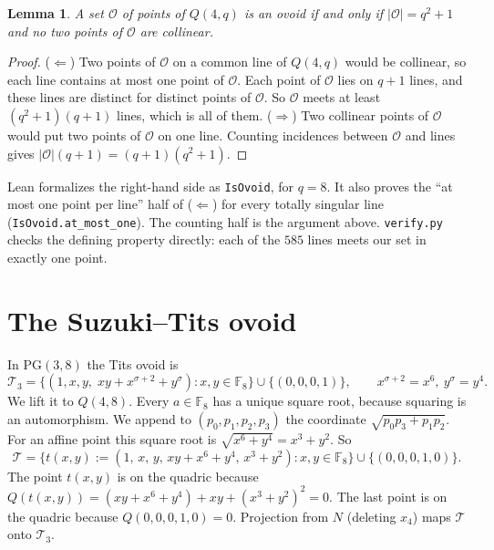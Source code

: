 \documentclass[11pt]{article}
\newtheorem{lemma}[theorem]{Lemma}
\theoremstyle{definition}
\theoremstyle{remark}
\newcommand{\F}{\mathbb{F}_8}
\begin{document}
\begin{lemma}\label{lem:equiv}
A set $\mathcal{O}$ of points of $Q(4,q)$ is an ovoid if and only if
$|\mathcal{O}|=q^2+1$ and no two points of $\mathcal{O}$ are collinear.
\end{lemma}
\begin{proof}
($\Leftarrow$) Two points of $\mathcal{O}$ on a common line of $Q(4,q)$ would
be collinear, so each line contains at most one point of $\mathcal{O}$. Each
point of $\mathcal{O}$ lies on $q+1$ lines, and these lines are distinct for
distinct points of $\mathcal{O}$. So $\mathcal{O}$ meets at least
$(q^2+1)(q+1)$ lines, which is all of them.
($\Rightarrow$) Two collinear points of $\mathcal{O}$ would put two points of
$\mathcal{O}$ on one line. Counting incidences between $\mathcal{O}$ and lines
gives $|\mathcal{O}|(q+1)=(q+1)(q^2+1)$.
\end{proof}
Lean formalizes the right-hand side as \texttt{IsOvoid}, for $q=8$. It also
proves the ``at most one point per line'' half of ($\Leftarrow$) for every
totally singular line (\texttt{IsOvoid.at\_most\_one}). The counting half is
the argument above. \texttt{verify.py} checks the defining property directly:
each of the $585$ lines meets our set in exactly one point.

\section{The Suzuki--Tits ovoid}
In $\mathrm{PG}(3,8)$ the Tits ovoid \cite{Tits} is
\[
\mathcal{T}_3=\{(1,x,y,\;xy+x^{\sigma+2}+y^{\sigma}) : x,y\in\F\}\cup\{(0,0,0,1)\},
\qquad x^{\sigma+2}=x^6,\ y^\sigma=y^4 .
\]
We lift it to $Q(4,8)$. Every $a\in\F$ has a unique square root, because
squaring is an automorphism. We append to $(p_0,p_1,p_2,p_3)$ the coordinate
$\sqrt{p_0p_3+p_1p_2}$. For an affine point this square root is
$\sqrt{x^6+y^4}=x^3+y^2$. So
\[
\mathcal{T}=\{t(x,y):=(1,\,x,\,y,\,xy+x^6+y^4,\,x^3+y^2) : x,y\in\F\}\cup\{(0,0,0,1,0)\}.
\]
The point $t(x,y)$ is on the quadric because
$Q(t(x,y))=(xy+x^6+y^4)+xy+(x^3+y^2)^2=0$. The last point is on the quadric
because $Q(0,0,0,1,0)=0$. Projection from $N$ (deleting $x_4$) maps
$\mathcal{T}$ onto $\mathcal{T}_3$.
\end{document}
